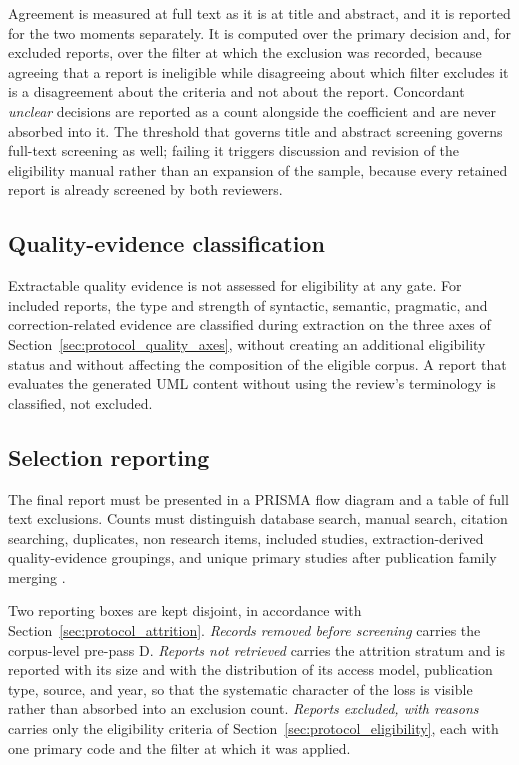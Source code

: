 Agreement is measured at full text as it is at title and abstract, and it is reported for the two moments separately. It is computed over the primary decision and, for excluded reports, over the filter at which the exclusion was recorded, because agreeing that a report is ineligible while disagreeing about which filter excludes it is a disagreement about the criteria and not about the report. Concordant \textit{unclear} decisions are reported as a count alongside the coefficient and are never absorbed into it. The threshold that governs title and abstract screening governs full-text screening as well; failing it triggers discussion and revision of the eligibility manual rather than an expansion of the sample, because every retained report is already screened by both reviewers.

\subsection{Quality-evidence classification}

Extractable quality evidence is not assessed for eligibility at any gate. For included reports, the type and strength of syntactic, semantic, pragmatic, and correction-related evidence are classified during extraction on the three axes of Section~\ref{sec:protocol_quality_axes}, without creating an additional eligibility status and without affecting the composition of the eligible corpus. A report that evaluates the generated UML content without using the review's terminology is classified, not excluded.

\subsection{Selection reporting}

The final report must be presented in a PRISMA flow diagram and a table of full text exclusions. Counts must distinguish database search, manual search, citation searching, duplicates, non research items, included studies, extraction-derived quality-evidence groupings, and unique primary studies after publication family merging \cite{Page2021PRISMA}.

Two reporting boxes are kept disjoint, in accordance with Section~\ref{sec:protocol_attrition}. \textit{Records removed before screening} carries the corpus-level pre-pass D. \textit{Reports not retrieved} carries the attrition stratum and is reported with its size and with the distribution of its access model, publication type, source, and year, so that the systematic character of the loss is visible rather than absorbed into an exclusion count. \textit{Reports excluded, with reasons} carries only the eligibility criteria of Section~\ref{sec:protocol_eligibility}, each with one primary code and the filter at which it was applied.

